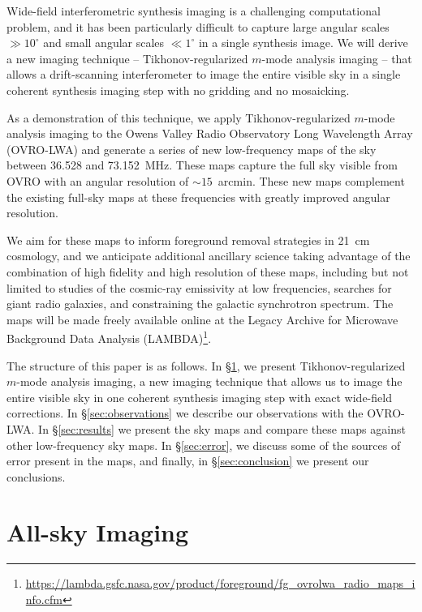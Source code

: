 \begin{bibunit}
Wide-field interferometric synthesis imaging is a challenging computational problem, and it has been
particularly difficult to capture large angular scales $\gg 10^\circ$ and small angular scales $\ll
1^\circ$ in a single synthesis image. We will derive a new imaging technique -- Tikhonov-regularized
$m$-mode analysis imaging -- that allows a drift-scanning interferometer to image the entire visible
sky in a single coherent synthesis imaging step with no gridding and no mosaicking.

As a demonstration of this technique, we apply Tikhonov-regularized $m$-mode analysis imaging to the
Owens Valley Radio Observatory Long Wavelength Array (OVRO-LWA) and generate a series of new
low-frequency maps of the sky between 36.528 and 73.152~MHz.  These maps capture the full sky
visible from OVRO with an angular resolution of $\sim 15$~arcmin.  These new maps complement the
existing full-sky maps at these frequencies with greatly improved angular resolution.

We aim for these maps to inform foreground removal strategies in 21~cm cosmology, and we anticipate
additional ancillary science taking advantage of the combination of high fidelity and high
resolution of these maps, including but not limited to studies of the cosmic-ray emissivity at low
frequencies, searches for giant radio galaxies, and constraining the galactic synchrotron spectrum.
The maps will be made freely available online at the Legacy Archive for Microwave Background Data
Analysis (LAMBDA)\footnote{
    \url{https://lambda.gsfc.nasa.gov/product/foreground/fg_ovrolwa_radio_maps_info.cfm}
}.

The structure of this paper is as follows. In \S\ref{sec:imaging}, we present Tikhonov-regularized
$m$-mode analysis imaging, a new imaging technique that allows us to image the entire visible sky in
one coherent synthesis imaging step with exact wide-field corrections. In \S\ref{sec:observations}
we describe our observations with the OVRO-LWA. In \S\ref{sec:results} we present the sky maps and
compare these maps against other low-frequency sky maps.  In \S\ref{sec:error}, we discuss some of
the sources of error present in the maps, and finally, in \S\ref{sec:conclusion} we present our
conclusions.

\section{All-sky Imaging}\label{sec:imaging}


\end{bibunit}
